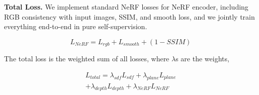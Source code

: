 \noindent
\textbf{Total Loss.} We implement standard NeRF losses for NeRF encoder, including RGB consistency with input images, SSIM, and smooth loss, and we jointly train everything end-to-end in pure self-supervision.

\vspace{-8mm}
\begin{equation}
    L_{NeRF} = L_{rgb} + L_{smooth} + (1 - SSIM)
\label{eq:nerf_loss}
\end{equation}
\vspace{-6mm}

\noindent
The total loss is the weighted sum of all losses, where $\lambda$s are the weights,

\vspace{-3mm}
\begin{multline}
    L_{total} = \lambda_{sdf}L_{sdf} + \lambda_{plane}L_{plane} \\ + 
    \lambda_{depth}L_{depth} + \lambda_{NeRF}L_{NeRF}
\label{eq:total_loss}
\end{multline}
\vspace{-5mm}
